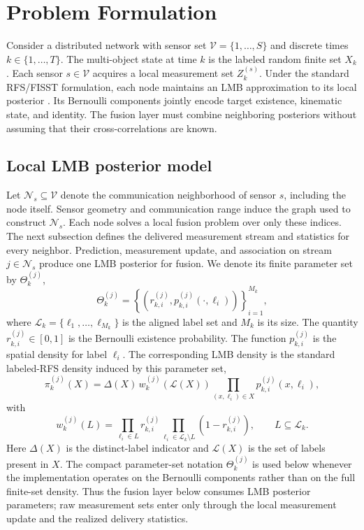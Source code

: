 \section{Problem Formulation}
\label{sec:problem-formulation}

Consider a distributed network with sensor set $\mathcal{V}=\{1,\ldots,S\}$ and discrete times $k \in \{1,\ldots,T\}$. The multi-object state at time $k$ is the labeled random finite set $X_k$. Each sensor $s \in \mathcal{V}$ acquires a local measurement set $Z_k^{(s)}$. Under the standard RFS/FISST formulation, each node maintains an LMB approximation to its local posterior \cite{Mahler2003PHD,Mahler2007FISSTBook,Vo2014LRFS,Reuter2014LMB,Vo2019MSGLMB}. Its Bernoulli components jointly encode target existence, kinematic state, and identity. The fusion layer must combine neighboring posteriors without assuming that their cross-correlations are known.

\subsection{Local LMB posterior model}

Let $\mathcal{N}_s \subseteq \mathcal{V}$ denote the communication neighborhood of sensor $s$, including the node itself. Sensor geometry and communication range induce the graph used to construct $\mathcal{N}_s$. Each node solves a local fusion problem over only these indices. The next subsection defines the delivered measurement stream and statistics for every neighbor. Prediction, measurement update, and association on stream $j \in \mathcal{N}_s$ produce one LMB posterior for fusion. We denote its finite parameter set by $\Theta_k^{(j)}$,
\begin{equation}
\Theta_{k}^{(j)} = \left\{ \left(r_{k,i}^{(j)}, p_{k,i}^{(j)}(\cdot,\ell_i)\right) \right\}_{i=1}^{M_k},
\end{equation}
where $\mathcal{L}_k=\{\ell_1,\ldots,\ell_{M_k}\}$ is the aligned label set and $M_k$ is its size. The quantity $r_{k,i}^{(j)} \in [0,1]$ is the Bernoulli existence probability. The function $p_{k,i}^{(j)}$ is the spatial density for label $\ell_i$. The corresponding LMB density is the standard labeled-RFS density induced by this parameter set,
\begin{equation}
\pi_k^{(j)}(X)
=
\Delta(X)\,
w_k^{(j)}\!\left(\mathcal{L}(X)\right)
\prod_{(x,\ell_i)\in X}p_{k,i}^{(j)}(x,\ell_i),
\end{equation}
with
\begin{equation}
w_k^{(j)}(L)
=
\prod_{\ell_i\in L}r_{k,i}^{(j)}
\prod_{\ell_i\in \mathcal{L}_k\setminus L}\left(1-r_{k,i}^{(j)}\right),
\qquad
L\subseteq\mathcal{L}_k.
\end{equation}
Here $\Delta(X)$ is the distinct-label indicator and $\mathcal{L}(X)$ is the set of labels present in $X$. The compact parameter-set notation $\Theta_k^{(j)}$ is used below whenever the implementation operates on the Bernoulli components rather than on the full finite-set density. Thus the fusion layer below consumes LMB posterior parameters; raw measurement sets enter only through the local measurement update and the realized delivery statistics.

